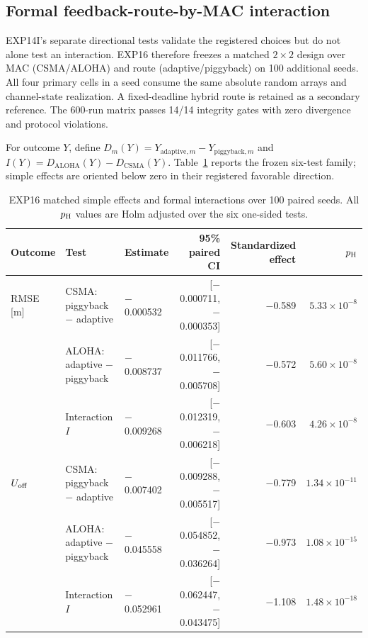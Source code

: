 \subsection{Formal feedback-route-by-MAC interaction}

EXP14I's separate directional tests validate the registered choices but do not
alone test an interaction. EXP16 therefore freezes a matched $2\times2$ design
over MAC (CSMA/ALOHA) and route (adaptive/piggyback) on 100 additional seeds.
All four primary cells in a seed consume the same absolute random arrays and
channel-state realization. A fixed-deadline hybrid route is retained as a
secondary reference. The 600-run matrix passes 14/14 integrity gates with zero
divergence and protocol violations.

For outcome $Y$, define
$D_m(Y)=Y_{\mathrm{adaptive},m}-Y_{\mathrm{piggyback},m}$ and
$I(Y)=D_{\mathrm{ALOHA}}(Y)-D_{\mathrm{CSMA}}(Y)$. Table~\ref{tab:s2-exp16}
reports the frozen six-test family; simple effects are oriented below zero in
their registered favorable direction.

\begin{table}[t]
\centering
\caption{EXP16 matched simple effects and formal interactions over 100 paired
seeds. All $p_{\rm H}$ values are Holm adjusted over the six one-sided tests.}
\label{tab:s2-exp16}
\scriptsize
\begin{tabular}{lllrrr}
\toprule
Outcome & Test & Estimate & 95\% paired CI & Standardized effect & $p_{\rm H}$ \\
\midrule
RMSE [m] & CSMA: piggyback $-$ adaptive & $-$0.000532 & [$-$0.000711,$-$0.000353] & $-$0.589 & $5.33\times10^{-8}$ \\
 & ALOHA: adaptive $-$ piggyback & $-$0.008737 & [$-$0.011766,$-$0.005708] & $-$0.572 & $5.60\times10^{-8}$ \\
 & Interaction $I$ & $-$0.009268 & [$-$0.012319,$-$0.006218] & $-$0.603 & $4.26\times10^{-8}$ \\
$U_{\rm off}$ & CSMA: piggyback $-$ adaptive & $-$0.007402 &
[$-$0.009288,$-$0.005517] & $-$0.779 & $1.34\times10^{-11}$ \\
 & ALOHA: adaptive $-$ piggyback & $-$0.045558 & [$-$0.054852,$-$0.036264] & $-$0.973 & $1.08\times10^{-15}$ \\
 & Interaction $I$ & $-$0.052961 & [$-$0.062447,$-$0.043475] & $-$1.108 & $1.48\times10^{-18}$ \\
\bottomrule
\end{tabular}
\end{table}

